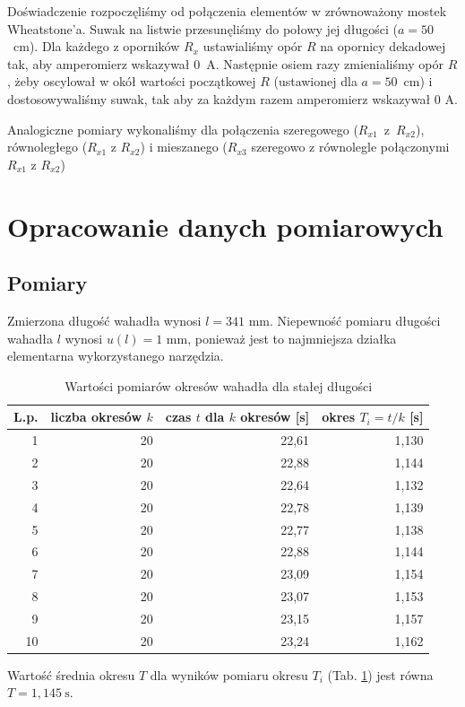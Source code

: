 \documentclass[12pt,a4paper]{article}
\numberwithin{equation}{section}
\begin{document}
Doświadczenie rozpoczęliśmy od połączenia elementów w zrównoważony mostek Wheatstone'a. Suwak na listwie przesunęliśmy do połowy jej długości ($a = 50$~cm). Dla każdego z oporników $R_x$ ustawialiśmy opór $R$ na opornicy dekadowej tak, aby amperomierz wskazywał $0$~A. Następnie osiem razy zmienialiśmy opór $R$, żeby oscylował w okół wartości początkowej $R$ (ustawionej dla $a = 50$~cm) i dostosowywaliśmy suwak, tak aby za każdym razem amperomierz wskazywał $0$ A.

Analogiczne pomiary wykonaliśmy dla połączenia szeregowego \mbox{($R_{x1}$ z $R_{x2}$)}, równoległego ($R_{x1}$ z $R_{x2}$) i mieszanego ($R_{x3}$ szeregowo z równolegle połączonymi $R_{x1}$ z $R_{x2}$)

\pagebreak
\section{Opracowanie danych pomiarowych}
\subsection{Pomiary}
Zmierzona długość wahadła wynosi $l = 341$ mm. Niepewność pomiaru długości wahadła $l$ wynosi $u(l) = 1$ mm, ponieważ jest to najmniejsza działka elementarna wykorzystanego narzędzia.

\begin{table}[!ht]
	\caption{Wartości pomiarów okresów wahadła dla stałej długości}
	\begin{center}
		\begin{tabular}{r|r|r|r}
			\hline
			\multicolumn{1}{c|}{L.p.} & \multicolumn{1}{c|}{liczba okresów $k$} & \multicolumn{1}{c|}{czas $t$ dla $k$ okresów [s]} & \multicolumn{1}{c}{okres $T_i = t/k$ [s]} \\ \hline \hline
			1 & 20 & 22,61 & 1,130 \\
			2 & 20 & 22,88 & 1,144 \\
			3 & 20 & 22,64 & 1,132 \\
			4 & 20 & 22,78 & 1,139 \\
			5 & 20 & 22,77 & 1,138 \\
			6 & 20 & 22,88 & 1,144 \\
			7 & 20 & 23,09 & 1,154 \\
			8 & 20 & 23,07 & 1,153 \\
			9 & 20 & 23,15 & 1,157 \\
			10 & 20 & 23,24 & 1,162 \\ \hline
		\end{tabular}
	\end{center}
	\label{tab:tab1}
\end{table}
Wartość średnia okresu $T$ dla wyników pomiaru okresu $T_i$ (Tab. \ref{tab:tab1}) jest równa $T = 1,145~\textrm{s}$. 
\end{document}
